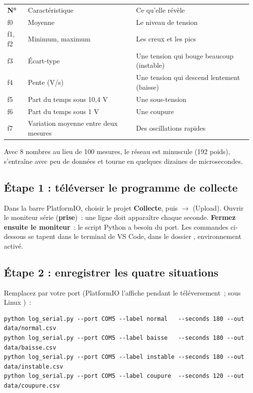 \begin{tabularx}{\linewidth}{P{0.9cm}P{4.4cm}L}
 \textbf{N°} & Caractéristique & Ce qu'elle révèle \\
f0 & Moyenne & Le niveau de tension \\
f1, f2 & Minimum, maximum & Les creux et les pics \\
f3 & Écart-type & Une tension qui bouge beaucoup (instable) \\
f4 & Pente (V/s) & Une tension qui descend lentement (baisse) \\
f5 & Part du temps sous 10,4 V & Une sous-tension \\
f6 & Part du temps sous 1 V & Une coupure \\
f7 & Variation moyenne entre deux mesures & Des oscillations rapides \\
\end{tabularx}

Avec 8 nombres au lieu de 100 mesures, le réseau est minuscule (192 poids), s'entraîne avec peu de données et tourne en quelques dizaines de microsecondes.

\subsection{Étape 1 : téléverser le programme de collecte}
Dans la barre PlatformIO, choisir le projet \textbf{Collecte}, puis \textbf{$\rightarrow$} (Upload). Ouvrir le moniteur série (\textbf{prise})~: une ligne  doit apparaître chaque seconde. \textbf{Fermez ensuite le moniteur}~: le script Python a besoin du port. Les commandes ci-dessous se tapent dans le terminal de VS Code, dans le dossier , environnement  activé.

\subsection{Étape 2 : enregistrer les quatre situations}
Remplacez  par votre port (PlatformIO l'affiche pendant le téléversement~; sous Linux )~:
\begin{lstlisting}[style=cmd]
python log_serial.py --port COM5 --label normal   --seconds 180 --out data/normal.csv
python log_serial.py --port COM5 --label baisse   --seconds 180 --out data/baisse.csv
python log_serial.py --port COM5 --label instable --seconds 180 --out data/instable.csv
python log_serial.py --port COM5 --label coupure  --seconds 120 --out data/coupure.csv
\end{lstlisting}

